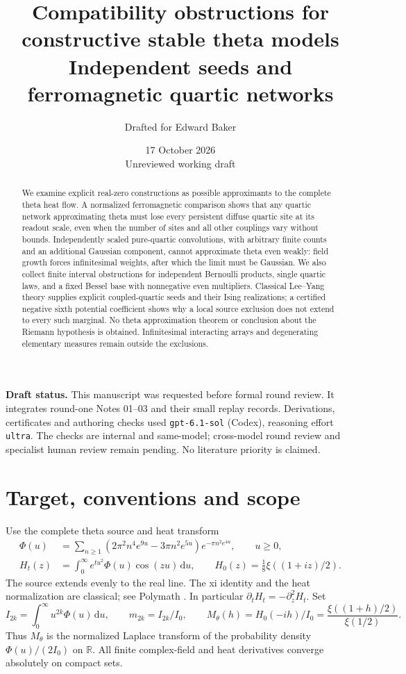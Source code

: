 \documentclass[11pt]{article}
\title{Compatibility obstructions for constructive stable theta models\\
\large Independent seeds and ferromagnetic quartic networks}
\author{Drafted for Edward Baker}
\date{17 October 2026\\\small Unreviewed working draft}
\theoremstyle{remark}
\newcommand{\R}{\mathbb R}
\newcommand{\dd}{\,\mathrm d}
\numberwithin{equation}{section}
\begin{document}
\maketitle
\begin{abstract}
We examine explicit real-zero constructions as possible approximants to the
complete theta heat flow. A normalized ferromagnetic comparison shows that
any quartic network approximating theta must lose every persistent diffuse
quartic site at its readout scale, even when the number of sites and all
other couplings vary without bounds. Independently scaled pure-quartic
convolutions, with arbitrary finite counts and an additional Gaussian
component, cannot approximate theta even weakly: field growth forces
infinitesimal weights, after which the limit must be Gaussian. We also collect
finite interval obstructions for independent Bernoulli products, single
quartic laws, and a fixed Bessel base with nonnegative even multipliers.
Classical Lee--Yang theory supplies explicit coupled-quartic seeds and
their Ising realizations; a certified negative sixth potential coefficient
shows why a local source exclusion does not extend to every such marginal.
No theta approximation theorem or conclusion about the Riemann hypothesis
is obtained. Infinitesimal interacting arrays and degenerating elementary
measures remain outside the exclusions.
\end{abstract}

\noindent\textbf{Draft status.}
This manuscript was requested before formal round review. It integrates
round-one Notes 01--03 and their small replay records. Derivations,
certificates and authoring checks used \texttt{gpt-6.1-sol} (Codex), reasoning
effort \texttt{ultra}. The checks are internal and same-model; cross-model
round review and specialist human review remain pending. No literature
priority is claimed.

\section{Target, conventions and scope}\label{sec:setup}

Use the complete theta source and heat transform
\begin{align}
\Phi(u)&=\sum_{n\ge1}
 (2\pi^2n^4e^{9u}-3\pi n^2e^{5u})e^{-\pi n^2e^{4u}},
 \qquad u\ge0,\label{eq:phi}\\
H_t(z)&=\int_0^\infty e^{tu^2}\Phi(u)\cos(zu)\dd u,
 \qquad H_0(z)=\tfrac18\xi((1+iz)/2).\label{eq:heat}
\end{align}
The source extends evenly to the real line. The xi identity and the heat
normalization are classical; see Polymath \cite{polymath}. In particular
\(\partial_tH_t=-\partial_z^2H_t\). Set
\[
 I_{2k}=\int_0^\infty u^{2k}\Phi(u)\dd u,\qquad
 m_{2k}=I_{2k}/I_0,\qquad
 M_\theta(h)=H_0(-ih)/I_0=\frac{\xi((1+h)/2)}{\xi(1/2)}.
\]
Thus \(M_\theta\) is the normalized Laplace transform of the probability
density \(\Phi(u)/(2I_0)\) on \(\R\). All finite complex-field and heat
derivatives converge absolutely on compact sets.
\end{document}
